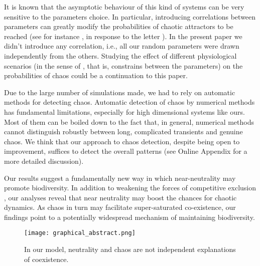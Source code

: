 It is known that the asymptotic behaviour of this kind of systems can be very sensitive to the parameters choice. In particular, introducing correlations between parameters can greatly modify the probabilities of chaotic attractors to be reached (see for instance \cite{Huisman2001}, in response to the letter \cite{Schippers2001}). In the present paper we didn't introduce any correlation, i.e., all our random parameters were drawn independently from the others. Studying the effect of different physiological scenarios (in the sense of \cite{Huisman2001}, that is, constrains between the parameters) on the probabilities of chaos could be a continuation to this paper.

Due to the large number of simulations made, we had to rely on automatic methods for detecting chaos. Automatic detection of chaos by numerical methods has fundamental limitations, especially for high dimensional systems like ours. Most of them can be boiled down to the fact that, in general, numerical methods cannot distinguish robustly between long, complicated transients and genuine chaos. We think that our approach to chaos detection, despite being open to improvement, suffices to detect the overall patterns (see Online Appendix for a more detailed discussion).

Our results suggest a fundamentally new way in which near-neutrality may promote biodiversity. In addition to weakening the forces of competitive exclusion \cite{Scheffer2018}, our analyses reveal that near neutrality may boost the chances for chaotic dynamics. As chaos in turn may facilitate super-saturated co-existence, our findings point to a potentially widespread mechanism of maintaining biodiversity.

\begin{figure}
	\begin{center}
		\texttt{[image: graphical\_abstract.png]}
	\end{center}
	\caption{In our model, neutrality and chaos are not independent explanations of coexistence.}
	\label{fig:GapInKnowledge}
\end{figure}